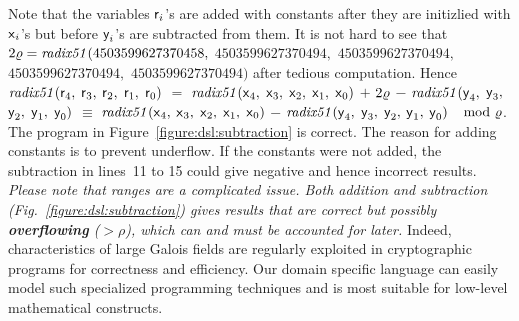 Note that the variables $\mbox{\textsf{r}}_i$'s are added with constants
after they are initizlied with $\mbox{\textsf{x}}_i$'s but before
$\mbox{\textsf{y}}_i$'s are subtracted from them. It is not hard to see that
$2\varrho = \mathit{radix51} (4503599627370458,$ $4503599627370494,$
$4503599627370494,$ $4503599627370494,$ $4503599627370494)$
after tedious computation. Hence $\mathit{radix51}(\mbox{\textsf{r}}_4,$
$\mbox{\textsf{r}}_3,$ $\mbox{\textsf{r}}_2,$ $\mbox{\textsf{r}}_1,$ $\mbox{\textsf{r}}_0)$ $=$
$\mathit{radix51}(\mbox{\textsf{x}}_4,$ $\mbox{\textsf{x}}_3,$ $\mbox{\textsf{x}}_2,$
$\mbox{\textsf{x}}_1,$ $\mbox{\textsf{x}}_0)$ $+$ $2 \varrho $ $-$
$\mathit{radix51}(\mbox{\textsf{y}}_4,$ $\mbox{\textsf{y}}_3,$ $\mbox{\textsf{y}}_2,$
$\mbox{\textsf{y}}_1,$ $\mbox{\textsf{y}}_0)$ $\equiv $
$\mathit{radix51}(\mbox{\textsf{x}}_4,$ $\mbox{\textsf{x}}_3,$ $\mbox{\textsf{x}}_2,$
$\mbox{\textsf{x}}_1,$ $\mbox{\textsf{x}}_0)$ $-$
$\mathit{radix51}(\mbox{\textsf{y}}_4,$ $\mbox{\textsf{y}}_3,$ $\mbox{\textsf{y}}_2,$
$\mbox{\textsf{y}}_1,$ $\mbox{\textsf{y}}_0)$ $\mod {\varrho} $. The program in
Figure~\ref{figure:dsl:subtraction} is correct. The reason for
adding constants is to prevent underflow. If the constants were not
added, the subtraction in lines~11 to 15 could give negative and hence
%
incorrect results. \emph{Please note that ranges are a complicated
  issue.  Both addition and subtraction (Fig.~\ref{figure:dsl:subtraction}) gives results that are correct
  but possibly \textbf{overflowing} ($>\rho$), which can and must be
  accounted for later.} Indeed, characteristics of large Galois fields
are
%
regularly exploited in cryptographic programs for correctness and
efficiency. Our domain specific language can easily model such
specialized programming techniques and is most suitable for low-level
mathematical constructs.


